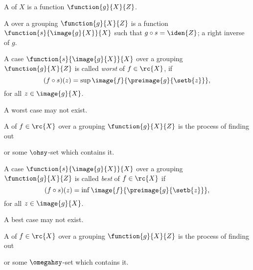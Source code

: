 \documentclass[b5paper, english, oneside]{memoir}
\begin{document}
\begin{definition}[Grouping]
A  of $X$ is a function $\function{g}{X}{Z}$. 
\end{definition}

\begin{definition}[Case]
A  over a grouping $\function{g}{X}{Z}$ is a function $\function{s}{\image{g}{X}}{X}$ such that $g \circ s = \iden{Z}$; a right inverse of $g$.
\end{definition}

\begin{definition}
A case $\function{s}{\image{g}{X}}{X}$ over a grouping $\function{g}{X}{Z}$ is called \emph{worst} of $f \in \rc{X}$, if
\begin{equation}
(f \circ s)(z) = \sup \image{f}{\preimage{g}{\setb{z}}},
\end{equation}
for all $z \in \image{g}{X}$.
\end{definition}

\begin{note}
A worst case may not exist.
\end{note}

\begin{definition}
A  of $f \in \rc{X}$ over a grouping $\function{g}{X}{Z}$ is the process of finding out
\begin{eqs}
\sup {}
\end{eqs}
or some $\ohsy$-set which contains it. 
\end{definition}

\begin{definition}
A case $\function{s}{\image{g}{X}}{X}$ over a grouping $\function{g}{X}{Z}$ is called \emph{best} of $f \in \rc{X}$ if
\begin{equation}
(f \circ s)(z) = \inf \image{f}{\preimage{g}{\setb{z}}},
\end{equation}
for all $z \in \image{g}{X}$. 
\end{definition}

\begin{note}
A best case may not exist.
\end{note}

\begin{definition}
A  of $f \in \rc{X}$ over a grouping $\function{g}{X}{Z}$ is the process of finding out
\begin{eqs}
\inf {}
\end{eqs}
or some $\omegahsy$-set which contains it.
\end{definition}
\end{document}
